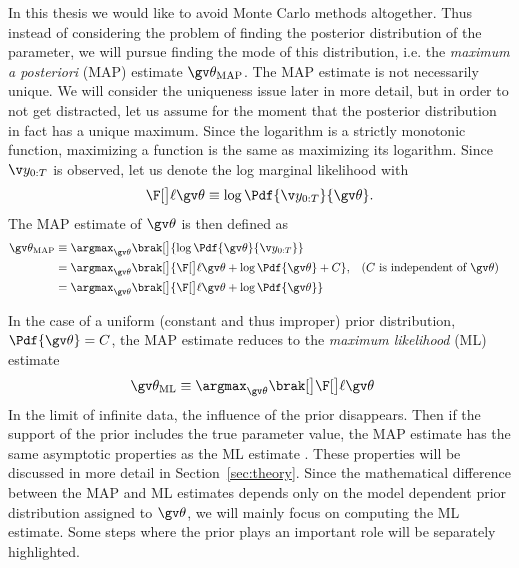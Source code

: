 In this thesis we would like to avoid Monte Carlo methods altogether. Thus instead
of considering the problem of finding the posterior distribution of the parameter,
we will pursue finding the mode of this distribution, i.e. the \emph{maximum a posteriori} (MAP) estimate
$\Th_{\text{MAP}}$. The MAP estimate is not necessarily unique. 
We will consider the uniqueness issue later in more detail, but in order
to not get distracted, let us assume for the moment that the posterior distribution in fact
has a unique maximum. Since the logarithm is a strictly monotonic function, maximizing a function
is the same as maximizing its logarithm. 
Since $\Y$ is observed, let us denote 
the log marginal likelihood with 
\begin{align*}
	\lLH \equiv \log \Pdf{\Y}{\Th}.
\end{align*}
The MAP estimate of $\Th$ is then defined as 
\begin{align}
	\Th_{\text{MAP}} &\equiv \argmax_{\Th}\brak[\big]{ \log\Pdf{\Th}{\Y}} \nonumber\\ 
	&=\argmax_{\Th}\brak[\big]{\lLH + \log\Pdf{\Th}+C}, && \text{($C$ is independent of $\Th$)} \nonumber\\
	&=\argmax_{\Th}\brak[\big]{\lLH + \log\Pdf{\Th}}\\
	\label{eq:MAP}
\end{align}

In the case of a uniform (constant and thus improper)
prior distribution, $\Pdf{\Th}=C$, the MAP estimate reduces to the
\emph{maximum likelihood} (ML) estimate
\begin{align}
	\Th_{\text{ML}} &\equiv \argmax_{\Th}\brak[\big]\lLH\label{eq:ML}
\end{align}
In the limit of infinite data, the influence of the prior
disappears. Then if the support of the prior includes the true
parameter value, the MAP estimate has the same asymptotic properties
as the ML estimate \parencite{Cappe2005}. These properties will be discussed in more
detail in Section~\ref{sec:theory}. Since the mathematical difference
between the MAP and ML estimates depends only on the model dependent prior distribution
assigned to $\Th$, we will mainly focus on computing the ML estimate.
Some steps where the prior plays an important role will be separately
highlighted. 

